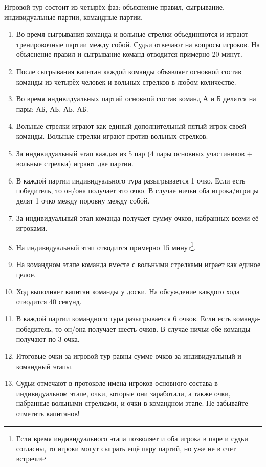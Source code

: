 \documentclass[11pt]{article} %
\begin{document}
Игровой тур состоит из четырёх фаз: объяснение правил, сыгрывание, индивидуальные партии, командные партии.

\begin{enumerate}
    \item Во время сыгрывания команда и вольные стрелки объединяются и играют тренировочные партии между собой. 
    Судьи отвечают на вопросы игроков. На объяснение правил и сыгрывание команд отводится примерно 20 минут. 
    \item После сыгрывания капитан каждой команды объявляет основной состав команды из четырёх человек и вольных стрелков в любом количестве.
    \item Во время индивидуальных партий основной состав команд А и Б делятся на пары: АБ, АБ, АБ, АБ. 
    \item Вольные стрелки играют как единый дополнительный пятый игрок своей команды. 
    Вольные стрелки играют против вольных стрелков. 
    \item За индивидуальный этап каждая из 5 пар (4 пары основных участиников + вольные стрелки) играют две партии.
    \item В каждой партии индивидуального тура разыгрывается 1 очко. Если есть победитель, то он/она получает это очко. В случае ничьи оба игрока/игрицы делят 1 очко между поровну между собой.
    \item За индивидуальный этап команда получает сумму очков, набранных всеми её игроками. 
    \item На индивидуальный этап отводится примерно 15 минут\footnote{Если время индивидуального этапа позволяет и оба игрока в паре и судьи согласны, то игроки могут сыграть ещё пару партий, но уже не в счет встречи}.
    \item На командном этапе команда вместе с вольными стрелками играет как единое целое. 
    \item Ход выполняет капитан команды у доски. На обсуждение каждого хода отводится 40 секунд. 
    \item В каждой партии командного тура разыгрывается 6 очков. Если есть команда-победитель, то он/она получает шесть очков. В случае ничьи обе команды получают по 3 очка.
    \item Итоговые очки за игровой тур равны сумме очков за индивидуальный и командный этапы.
    \item Судьи отмечают в протоколе имена игроков основного состава в индивидуальном этапе, очки, которые они заработали, 
    а также очки, набранные вольными стрелками, и очки в командном этапе. Не забывайте отметить капитанов!
\end{enumerate}

\newpage
\newcommand\sqw{1}
\newcommand\square[4][1]{\fill[#4] (#2*\sqw,#3*\sqw) rectangle +(#1*\sqw,#1*\sqw);}
\renewcommand\sqw{1.5}
\begin{center}
\vfill
{}
\end{center}
\end{document}

